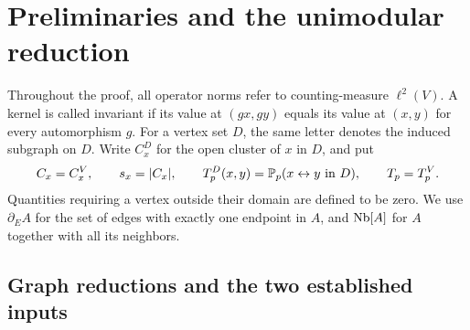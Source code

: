 \section{Preliminaries and the unimodular reduction}
\label{pre:section}

Throughout the proof, all operator norms refer to counting-measure
$\ell^2(V)$. A kernel is called invariant if its value at $(gx,gy)$ equals
its value at $(x,y)$ for every automorphism $g$. For a vertex set $D$, the
same letter denotes the induced subgraph on $D$. Write $C_x^D$ for the
open cluster of $x$ in $D$, and put
\[
 C_x=C_x^V,\qquad s_x=|C_x|,\qquad
 T_p^D(x,y)=\mathbb P_p(x\leftrightarrow y\text{ in }D),\qquad T_p=T_p^V.
\]
Quantities requiring a vertex outside their domain are defined to be zero.
We use $\partial_E A$ for the set of edges with exactly one endpoint in
$A$, and $\operatorname{Nb}[A]$ for $A$ together with all its neighbors.

\subsection{Graph reductions and the two established inputs}
\label{pre:reductions}

